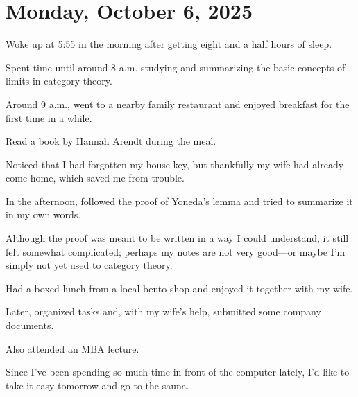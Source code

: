 \documentclass[uplatex]{jsarticle}
\begin{document}
\section{Monday, October 6, 2025}

Woke up at 5:55 in the morning after getting eight and a half hours of sleep.  

Spent time until around 8 a.m. studying and summarizing the basic concepts of limits in category theory.  

Around 9 a.m., went to a nearby family restaurant and enjoyed breakfast for the first time in a while.  

Read a book by Hannah Arendt during the meal.  

Noticed that I had forgotten my house key, but thankfully my wife had already come home, which saved me from trouble.  

In the afternoon, followed the proof of Yoneda's lemma and tried to summarize it in my own words.  

Although the proof was meant to be written in a way I could understand, it still felt somewhat complicated; perhaps my notes are not very good—or maybe I'm simply not yet used to category theory.  

Had a boxed lunch from a local bento shop and enjoyed it together with my wife.  

Later, organized tasks and, with my wife's help, submitted some company documents.  

Also attended an MBA lecture.  

Since I've been spending so much time in front of the computer lately, I'd like to take it easy tomorrow and go to the sauna.
\end{document}
